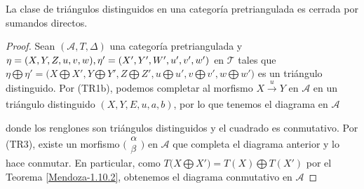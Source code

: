 \documentclass[tesis]{subfiles}
\begin{document}
\begin{Prop}\label{Mendoza_CT-1.10}

    La clase de triángulos distinguidos en una categoría pretriangulada es cerrada por sumandos directos.
\end{Prop}

\begin{proof}

    Sean $(\mathscr{A},T,\Delta)$ una categoría pretriangulada y $\eta=(X,Y,Z,u,v,w), \eta'=(X',Y',W',u',\break v',w')$ en $\mathscr{T}$ tales que $\eta\bigoplus\eta' = \big(X\bigoplus X',Y\bigoplus Y', Z\bigoplus Z', u\bigoplus u', v\bigoplus v', w\bigoplus w'\big)$ es un triángulo distinguido. Por (TR1b), podemos completar al morfismo $X\xrightarrow[]{u}Y$ en $\mathscr{A}$ en un triángulo distinguido $(X,Y,E,u,a,b)$, por lo que tenemos el diagrama en $\mathscr{A}$
    \begin{center}
    \end{center}
    donde los renglones son triángulos distinguidos y el cuadrado es conmutativo. Por (TR3), existe un morfismo $\big(\begin{smallmatrix} \alpha \\ \beta \end{smallmatrix}\big)$ en $\mathscr{A}$ que completa el diagrama anterior y lo hace conmutar. En particular, como $T\big(X\bigoplus X'\big) = T(X)\bigoplus T(X')$ por el Teorema \ref{Mendoza-1.10.2}, obtenemos el diagrama conmutativo en $\mathscr{A}$

\end{proof}
\end{document}
